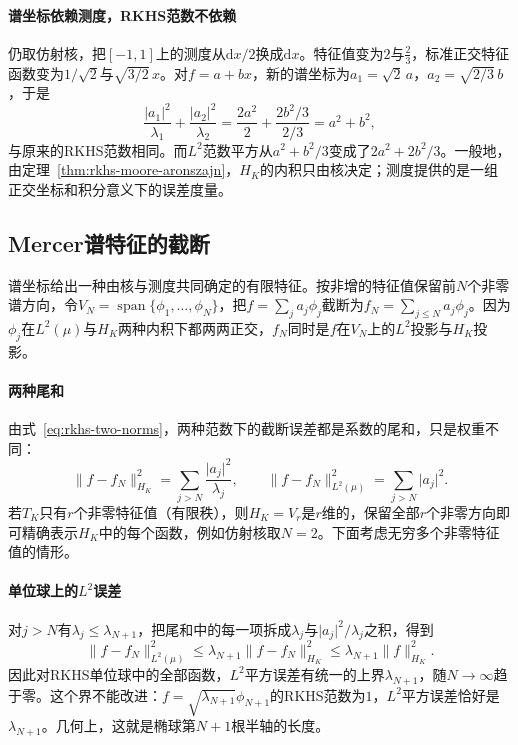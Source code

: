\paragraph{谱坐标依赖测度，RKHS范数不依赖}

仍取仿射核，把$[-1,1]$上的测度从$\mathrm dx/2$换成$\mathrm dx$。特征值变为$2$与$\tfrac23$，标准正交特征函数变为$1/\sqrt2$与$\sqrt{3/2}\,x$。对$f=a+bx$，新的谱坐标为$a_1=\sqrt2\,a$，$a_2=\sqrt{2/3}\,b$，于是
\[
\frac{\lvert a_1\rvert^2}{\lambda_1}+\frac{\lvert a_2\rvert^2}{\lambda_2}=\frac{2a^2}{2}+\frac{2b^2/3}{2/3}=a^2+b^2 ,
\]
与原来的RKHS范数相同。而$L^2$范数平方从$a^2+b^2/3$变成了$2a^2+2b^2/3$。一般地，由定理~\ref{thm:rkhs-moore-aronszajn}，$H_K$的内积只由核决定；测度提供的是一组正交坐标和积分意义下的误差度量。

\subsection{Mercer谱特征的截断}
\label{sec:rkhs-spectral-truncation}

谱坐标给出一种由核与测度共同确定的有限特征。按非增的特征值保留前$N$个非零谱方向，令$V_N=\operatorname{span}\{\phi_1,\ldots,\phi_N\}$，把$f=\sum_ja_j\phi_j$截断为$f_N=\sum_{j\leq N}a_j\phi_j$。因为$\phi_j$在$L^2(\mu)$与$H_K$两种内积下都两两正交，$f_N$同时是$f$在$V_N$上的$L^2$投影与$H_K$投影。

\paragraph{两种尾和}

由式~\eqref{eq:rkhs-two-norms}，两种范数下的截断误差都是系数的尾和，只是权重不同：
\begin{equation}
\lVert f-f_N\rVert_{H_K}^2=\sum_{j>N}\frac{\lvert a_j\rvert^2}{\lambda_j},\qquad
\lVert f-f_N\rVert_{L^2(\mu)}^2=\sum_{j>N}\lvert a_j\rvert^2 .
\label{eq:rkhs-tail-sums}
\end{equation}
若$T_K$只有$r$个非零特征值（有限秩），则$H_K=V_r$是$r$维的，保留全部$r$个非零方向即可精确表示$H_K$中的每个函数，例如仿射核取$N=2$。下面考虑无穷多个非零特征值的情形。

\paragraph{单位球上的$L^2$误差}

对$j>N$有$\lambda_j\leq\lambda_{N+1}$，把尾和中的每一项拆成$\lambda_j$与$\lvert a_j\rvert^2/\lambda_j$之积，得到
\begin{equation}
\lVert f-f_N\rVert_{L^2(\mu)}^2\leq\lambda_{N+1}\lVert f-f_N\rVert_{H_K}^2\leq\lambda_{N+1}\lVert f\rVert_{H_K}^2 .
\label{eq:rkhs-tail-comparison}
\end{equation}
因此对RKHS单位球中的全部函数，$L^2$平方误差有统一的上界$\lambda_{N+1}$，随$N\to\infty$趋于零。这个界不能改进：$f=\sqrt{\lambda_{N+1}}\phi_{N+1}$的RKHS范数为$1$，$L^2$平方误差恰好是$\lambda_{N+1}$。几何上，这就是椭球第$N+1$根半轴的长度。

